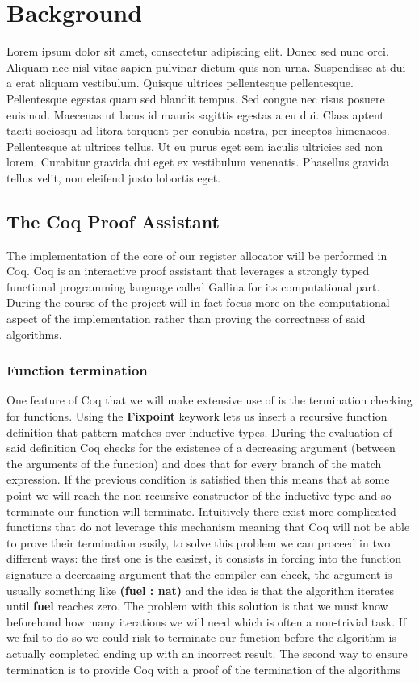 \chapter{Background}
\label{cha:background}
Lorem ipsum dolor sit amet, consectetur adipiscing elit. Donec sed nunc orci. Aliquam nec nisl vitae sapien pulvinar dictum quis non urna. Suspendisse at dui a erat aliquam vestibulum. Quisque ultrices pellentesque pellentesque. Pellentesque egestas quam sed blandit tempus. Sed congue nec risus posuere euismod. Maecenas ut lacus id mauris sagittis egestas a eu dui. Class aptent taciti sociosqu ad litora torquent per conubia nostra, per inceptos himenaeos. Pellentesque at ultrices tellus. Ut eu purus eget sem iaculis ultricies sed non lorem. Curabitur gravida dui eget ex vestibulum venenatis. Phasellus gravida tellus velit, non eleifend justo lobortis eget. 

\section{The Coq Proof Assistant}
The implementation of the core of our register allocator will be performed in Coq. Coq is an interactive proof assistant that leverages a strongly typed functional programming language called Gallina for its computational part. 
During the course of the project will in fact focus more on the computational aspect of the implementation rather than proving the correctness of said algorithms.

\subsection{Function termination}
One feature of Coq that we will make extensive use of is the termination checking for functions. Using the \textbf{Fixpoint} keywork lets us insert a recursive function definition that pattern matches over inductive types.
During the evaluation of said definition Coq checks for the existence of a decreasing argument (between the arguments of the function) and does that for every branch of the match expression. If the previous condition is satisfied then this means that at some point we will reach the non-recursive constructor of the inductive type and so terminate our function will terminate.
Intuitively there exist more complicated functions that do not leverage this mechanism meaning that Coq will not be able to prove their termination easily, to solve this problem we can proceed in two different ways:
the first one is the easiest, it consists in forcing into the function signature a decreasing argument that the compiler can check, the argument is usually something like \textbf{(fuel : nat)} and the idea is that the algorithm iterates until \textbf{fuel} reaches zero. The problem with this solution is that we must know beforehand how many iterations we will need which is often a non-trivial task. If we fail to do so we could risk to terminate our function before the algorithm is actually completed ending up with an incorrect result.
The second way to ensure termination is to provide Coq with a proof of the termination of the algorithms

